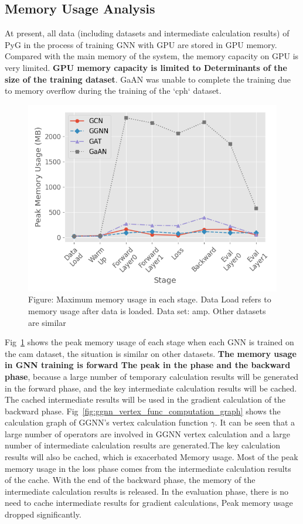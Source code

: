 \subsection{Memory Usage Analysis}

At present, all data (including datasets and intermediate calculation results) of PyG in the process of training GNN with GPU
are stored in GPU memory. Compared with the main memory of the system, the memory capacity on GPU is very limited.
\textbf{GPU memory capacity is limited to Determinants of the size of the training dataset}. 
GaAN was unable to complete the training due to memory overflow during the training of the `cph` dataset.

\begin{figure}
    \centering
    \includegraphics[width=0.7\columnwidth]{figs/experiments/exp_memory_usage_stage_amp.png}
    \caption{Figure: Maximum memory usage in each stage. Data Load refers to memory usage after data is loaded. Data set: amp. Other datasets are similar}
    \label{fig:exp_memory_usage_stage_amp}
\end{figure}

Fig~\ref{fig:exp_memory_usage_stage_amp} shows the peak memory usage of each stage when each GNN is trained on the cam dataset, the situation is similar on other datasets.
\textbf{The memory usage in GNN training is forward The peak in the phase and the backward phase}, 
because a large number of temporary calculation results will be generated in the forward phase,
and the key intermediate calculation results will be cached.
The cached intermediate results will be used in the gradient calculation of the backward phase.
Fig~\ref{fig:ggnn_vertex_func_computation_graph} shows the calculation graph of GGNN's vertex calculation function $\gamma$.
It can be seen that a large number of operators are involved in GGNN vertex calculation and a large number of intermediate calculation results are generated.The key calculation results will also be cached,
which is exacerbated Memory usage. Most of the peak memory usage in the loss phase comes from the intermediate calculation results of the cache.
With the end of the backward phase, the memory of the intermediate calculation results is released.
In the evaluation phase, there is no need to cache intermediate results for gradient calculations, Peak memory usage dropped significantly.

